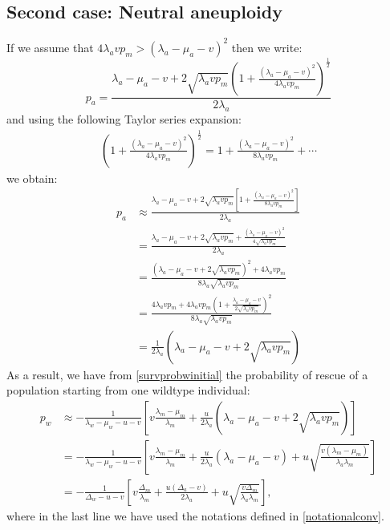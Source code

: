 \documentclass[12pt]{extarticle}
\begin{document}
\subsection*{Second case: Neutral aneuploidy}
If we assume that  $4\lambda_avp_m>\left(\lambda_a-\mu_a-v\right)^2$ then we write:
\begin{equation}
p_a=\frac{\lambda_a-\mu_a-v+2\sqrt{\lambda_a vp_m}\left(1+\frac{\left(\lambda_a-\mu_a-v\right)^2}{4\lambda_avp_m}\right)^{\frac12}}{2\lambda_a}
\end{equation}
and using the following Taylor series expansion:
\begin{align*}
\left(1+\frac{\left(\lambda_a-\mu_a-v\right)^2}{4\lambda_avp_m}\right)^{\frac{1}{2}}=1+\frac{\left(\lambda_a-\mu_a-v\right)^2}{8\lambda_avp_m}+\cdots
\end{align*}
we obtain:
\begin{align*}
p_a&\approx\frac{\lambda_a-\mu_a-v+2\sqrt{\lambda_a vp_m}\left[1+\frac{\left(\lambda_a-\mu_a-v\right)^2}{8\lambda_avp_m}\right]}{2\lambda_a}\\
&=\frac{\lambda_a-\mu_a-v+2\sqrt{\lambda_a vp_m}+\frac{\left(\lambda_a-\mu_a-v\right)^2}{4\sqrt{\lambda_avp_m}}}{2\lambda_a}\\
&=\frac{\left(\lambda_a-\mu_a-v+2\sqrt{\lambda_avp_m}\right)^2+4\lambda_avp_m}{8\lambda_a\sqrt{\lambda_avp_m}}\\
&=\frac{4\lambda_avp_m+4\lambda_avp_m\left(1+\frac{\lambda_a-\mu_a-v}{2\sqrt{\lambda_avp_m}}\right)^2}{8\lambda_a\sqrt{\lambda_avp_m}}\\
&=\frac{1}{2\lambda_a}\left(\lambda_a-\mu_a-v+2\sqrt{\lambda_avp_m}\right)
\end{align*}
As a result, we have from \eqref{survprobwinitial} the probability of rescue of a population starting from one wildtype individual:
\begin{align*}
p_w&\approx-\frac{1}{\lambda_w-\mu_w-u-v}\left[v\frac{\lambda_m-\mu_m}{\lambda_m}+\frac{u}{2\lambda_a}\left(\lambda_a-\mu_a-v+2\sqrt{\lambda_avp_m}\right)\right]\\
&=-\frac{1}{\lambda_w-\mu_w-u-v}\left[v\frac{\lambda_m-\mu_m}{\lambda_m}+\frac{u}{2\lambda_a}\left(\lambda_a-\mu_a-v\right)+u\sqrt{\frac{v\left(\lambda_m-\mu_m\right)}{\lambda_a\lambda_m}}\right]\\
&=-\frac{1}{\Delta_w-u-v}\left[v\frac{\Delta_m}{\lambda_m}+\frac{u\left(\Delta_a-v\right)}{2\lambda_a}+u\sqrt{\frac{v\Delta_m}{\lambda_a\lambda_m}}\right],
\end{align*}
where in the last line we have used the notations defined in \eqref{notationalconv}.
\end{document}
